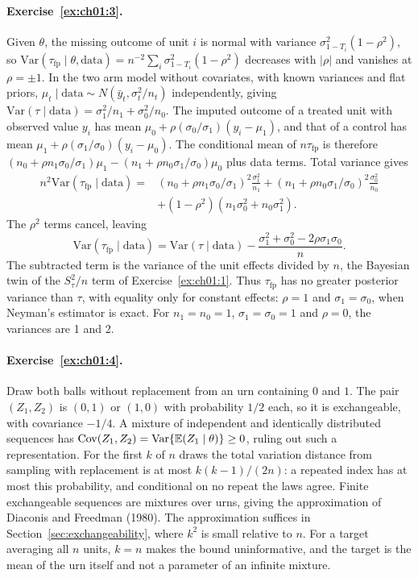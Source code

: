 \paragraph{Exercise~\ref{ex:ch01:3}.} Given $\theta$, the missing outcome of unit $i$ is normal with variance $\sigma_{1-T_i}^2(1-\rho^2)$, so $\mathrm{Var}(\tau_{\mathrm{fp}}\mid\theta,\text{data})=n^{-2}\sum_i\sigma_{1-T_i}^2(1-\rho^2)$ decreases with $|\rho|$ and vanishes at $\rho=\pm1$. In the two arm model without covariates, with known variances and flat priors, $\mu_t\mid\text{data}\sim N(\bar y_t,\sigma_t^2/n_t)$ independently, giving $\mathrm{Var}(\tau\mid\text{data})=\sigma_1^2/n_1+\sigma_0^2/n_0$. The imputed outcome of a treated unit with observed value $y_i$ has mean $\mu_0+\rho(\sigma_0/\sigma_1)(y_i-\mu_1)$, and that of a control has mean $\mu_1+\rho(\sigma_1/\sigma_0)(y_i-\mu_0)$. The conditional mean of $n\tau_{\mathrm{fp}}$ is therefore $(n_0+\rho n_1\sigma_0/\sigma_1)\mu_1-(n_1+\rho n_0\sigma_1/\sigma_0)\mu_0$ plus data terms. Total variance gives
\[
\begin{split}
n^2\mathrm{Var}(\tau_{\mathrm{fp}}\mid\text{data})={}&(n_0+\rho n_1\sigma_0/\sigma_1)^2\frac{\sigma_1^2}{n_1}+(n_1+\rho n_0\sigma_1/\sigma_0)^2\frac{\sigma_0^2}{n_0}\\
&+(1-\rho^2)(n_1\sigma_0^2+n_0\sigma_1^2).
\end{split}
\]
The $\rho^2$ terms cancel, leaving
\[
\mathrm{Var}(\tau_{\mathrm{fp}}\mid\text{data})=\mathrm{Var}(\tau\mid\text{data})-\frac{\sigma_1^2+\sigma_0^2-2\rho\sigma_1\sigma_0}{n}.
\]
The subtracted term is the variance of the unit effects divided by $n$, the Bayesian twin of the $S_\tau^2/n$ term of Exercise~\ref{ex:ch01:1}. Thus $\tau_{\mathrm{fp}}$ has no greater posterior variance than $\tau$, with equality only for constant effects: $\rho=1$ and $\sigma_1=\sigma_0$, when Neyman's estimator is exact. For $n_1=n_0=1$, $\sigma_1=\sigma_0=1$ and $\rho=0$, the variances are 1 and 2.

\paragraph{Exercise~\ref{ex:ch01:4}.} Draw both balls without replacement from an urn containing $0$ and $1$. The pair $(Z_1,Z_2)$ is $(0,1)$ or $(1,0)$ with probability $1/2$ each, so it is exchangeable, with covariance $-1/4$. A mixture of independent and identically distributed sequences has $\mathrm{Cov}(Z_1,Z_2)=\mathrm{Var}\{\mathbb{E}(Z_1\mid\theta)\}\geq0$, ruling out such a representation. For the first $k$ of $n$ draws the total variation distance from sampling with replacement is at most $k(k-1)/(2n)$: a repeated index has at most this probability, and conditional on no repeat the laws agree. Finite exchangeable sequences are mixtures over urns, giving the approximation of Diaconis and Freedman (1980). The approximation suffices in Section~\ref{sec:exchangeability}, where $k^2$ is small relative to $n$. For a target averaging all $n$ units, $k=n$ makes the bound uninformative, and the target is the mean of the urn itself and not a parameter of an infinite mixture.

